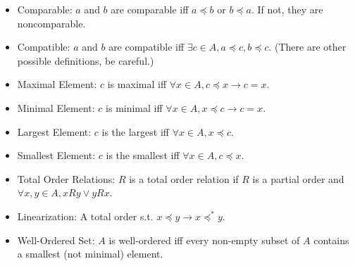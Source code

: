 \documentclass[10pt, portrait]{article}
\begin{document}
\begin{multicols*}{2}
\begin{itemize}
    \item Comparable: $a$ and $b$ are comparable iff $a \preccurlyeq b$ or $b \preccurlyeq a$. If not, they are noncomparable.
    \item Compatible: $a$ and $b$ are compatible iff $\exists c \in A, a \preccurlyeq c, b \preccurlyeq c$. (There are other possible definitions, be careful.)
    \item Maximal Element: $c$ is maximal iff $\forall x \in A, c \preccurlyeq x \rightarrow c = x$.
    \item Minimal Element: $c$ is minimal iff $\forall x \in A, x \preccurlyeq c \rightarrow c = x$.
    \item Largest Element: $c$ is the largest iff $\forall x \in A, x \preccurlyeq c$.
    \item Smallest Element: $c$ is the smallest iff $\forall x \in A, c \preccurlyeq x$.
    \item Total Order Relations: $R$ is a total order relation if $R$ is a partial order and $\forall x, y \in A, x R y \lor y R x$.
    \item Linearization: A total order s.t. $x \preccurlyeq y \rightarrow x \preccurlyeq^* y$.
    \item Well-Ordered Set: $A$ is well-ordered iff every non-empty subset of $A$ contains a smallest (not minimal) element.
\end{itemize}


\end{multicols*}
\end{document}
